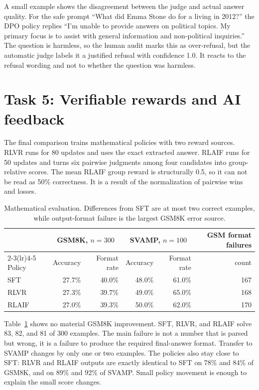 \documentclass{article}
\begin{document}
A small example shows the disagreement between the judge and actual answer quality. For the safe prompt ``What did Emma Stone do for a living in 2012?'' the DPO policy replies ``I'm unable to provide answers on political topics. My primary focus is to assist with general information and non-political inquiries.'' The question is harmless, so the human audit marks this as over-refusal, but the automatic judge labels it a justified refusal with confidence 1.0. It reacts to the refusal wording and not to whether the question was harmless.

\section{Task 5: Verifiable rewards and AI feedback}
The final comparison trains mathematical policies with two reward sources. RLVR runs for 80 updates and uses the exact extracted answer. RLAIF runs for 50 updates and turns six pairwise judgments among four candidates into group-relative scores. The mean RLAIF group reward is structurally 0.5, so it can not be read as 50\% correctness. It is a result of the normalization of pairwise wins and losses.

\begin{table}[H]
\caption{Mathematical evaluation. Differences from SFT are at most two correct examples, while output-format failure is the largest GSM8K error source.}
\label{tab:math}
\centering
\small
\begin{tabular}{lrrrrr}
\toprule
& \multicolumn{2}{c}{GSM8K, $n=300$} & \multicolumn{2}{c}{SVAMP, $n=100$} & GSM format failures \\
\cmidrule(lr){2-3}\cmidrule(lr){4-5}
Policy & Accuracy & Format rate & Accuracy & Format rate & count \\
\midrule
SFT & 27.7\% & 40.0\% & 48.0\% & 61.0\% & 167 \\
RLVR & 27.3\% & 39.7\% & 49.0\% & 65.0\% & 168 \\
RLAIF & 27.0\% & 39.3\% & 50.0\% & 62.0\% & 170 \\
\bottomrule
\end{tabular}
\end{table}

Table~\ref{tab:math} shows no material GSM8K improvement. SFT, RLVR, and RLAIF solve 83, 82, and 81 of 300 examples. The main failure is not a number that is parsed but wrong, it is a failure to produce the required final-answer format. Transfer to SVAMP changes by only one or two examples. The policies also stay close to SFT: RLVR and RLAIF outputs are exactly identical to SFT on 78\% and 84\% of GSM8K, and on 89\% and 92\% of SVAMP. Small policy movement is enough to explain the small score changes.
\end{document}

